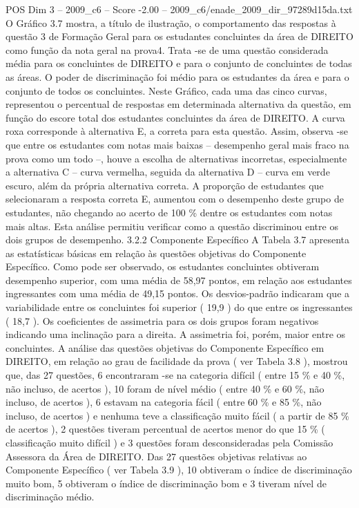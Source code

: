 \begin{textsample}{POS Dim 3 – 2009\_c6 – Score -2.00 – 2009\_c6/enade\_2009\_dir\_97289d15da.txt}
O Gráfico 3.7 mostra, a título de ilustração, o comportamento das respostas à questão 3 de Formação Geral para os estudantes concluintes da área de DIREITO como função da nota geral na prova4.
Trata -se de uma questão considerada média para os concluintes de DIREITO e para o conjunto de concluintes de todas as áreas.
O poder de discriminação foi médio para os estudantes da área e para o conjunto de todos os concluintes.
Neste Gráfico, cada uma das cinco curvas, representou o percentual de respostas em determinada alternativa da questão, em função do escore total dos estudantes concluintes da área de DIREITO.
A curva roxa corresponde à alternativa E, a correta para esta questão.
Assim, observa -se que entre os estudantes com notas mais baixas – desempenho geral mais fraco na prova como um todo –, houve a escolha de alternativas incorretas, especialmente a alternativa C – curva vermelha, seguida da alternativa D – curva em verde escuro, além da própria alternativa correta.
A proporção de estudantes que selecionaram a resposta correta E, aumentou com o desempenho deste grupo de estudantes, não chegando ao acerto de 100 \% dentre os estudantes com notas mais altas.
Esta análise permitiu verificar como a questão discriminou entre os dois grupos de desempenho. 3.2.2 Componente Específico A Tabela 3.7 apresenta as estatísticas básicas em relação às questões objetivas do Componente Específico.
Como pode ser observado, os estudantes concluintes obtiveram desempenho superior, com uma média de 58,97 pontos, em relação aos estudantes ingressantes com uma média de 49,15 pontos.
Os desvios-padrão indicaram que a variabilidade entre os concluintes foi superior ( 19,9 ) do que entre os ingressantes ( 18,7 ).
Os coeficientes de assimetria para os dois grupos foram negativos indicando uma inclinação para a direita.
A assimetria foi, porém, maior entre os concluintes.
A análise das questões objetivas do Componente Específico em DIREITO, em relação ao grau de facilidade da prova ( ver Tabela 3.8 ), mostrou que, das 27 questões, 6 encontraram -se na categoria difícil ( entre 15 \% e 40 \%, não incluso, de acertos ), 10 foram de nível médio ( entre 40 \% e 60 \%, não incluso, de acertos ), 6 estavam na categoria fácil ( entre 60 \% e 85 \%, não incluso, de acertos ) e nenhuma teve a classificação muito fácil ( a partir de 85 \% de acertos ), 2 questões tiveram percentual de acertos menor do que 15 \% ( classificação muito difícil ) e 3 questões foram desconsideradas pela Comissão Assessora da Área de DIREITO.
Das 27 questões objetivas relativas ao Componente Específico ( ver Tabela 3.9 ), 10 obtiveram o índice de discriminação muito bom, 5 obtiveram o índice de discriminação bom e 3 tiveram nível de discriminação médio.

\end{textsample}
